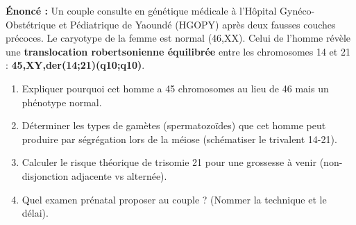 \documentclass[11pt]{article}
\begin{document}
\begin{exercice}
\textbf{Énoncé :} Un couple consulte en génétique médicale à l'Hôpital Gynéco-Obstétrique et Pédiatrique de Yaoundé (HGOPY) après deux fausses couches précoces. Le caryotype de la femme est normal (46,XX). Celui de l'homme révèle une \textbf{translocation robertsonienne équilibrée} entre les chromosomes 14 et 21 : \textbf{45,XY,der(14;21)(q10;q10)}.
\begin{enumerate}
    \item Expliquer pourquoi cet homme a 45 chromosomes au lieu de 46 mais un phénotype normal.
    \item Déterminer les types de gamètes (spermatozoïdes) que cet homme peut produire par ségrégation lors de la méiose (schématiser le trivalent 14-21).
    \item Calculer le risque théorique de trisomie 21 pour une grossesse à venir (non-disjonction adjacente vs alternée).
    \item Quel examen prénatal proposer au couple ? (Nommer la technique et le délai).
\end{enumerate}
\end{exercice}
\end{document}

